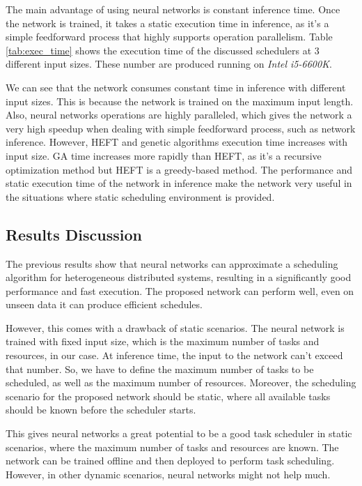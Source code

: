 The main advantage of using neural networks is constant inference time. Once the network is trained, it takes a static execution time in inference, as it's a simple feedforward process that highly supports operation parallelism. Table \ref{tab:exec_time} shows the execution time of the discussed schedulers at 3 different input sizes. These number are produced running on \emph{Intel i5-6600K}. 

We can see that the network consumes constant time in inference with different input sizes. This is because the network is trained on the maximum input length. Also, neural networks operations are highly paralleled, which gives the network a very high speedup when dealing with simple feedforward process, such as network inference. However, HEFT and genetic algorithms execution time increases with input size. GA time increases more rapidly than HEFT, as it's a recursive optimization method but HEFT is a greedy-based method. The performance and static execution time of the network in inference make the network very useful in the situations where static scheduling environment is provided.

\subsection{Results Discussion}
The previous results show that neural networks can approximate a scheduling algorithm for heterogeneous distributed systems, resulting in a significantly good performance and fast execution. The proposed network can perform well, even on unseen data it can produce efficient schedules.

However, this comes with a drawback of static scenarios. The neural network is trained with fixed input size, which is the maximum number of tasks and resources, in our case. At inference time, the input to the network can't exceed that number. So, we have to define the maximum number of tasks to be scheduled, as well as the maximum number of resources. Moreover, the scheduling scenario for the proposed network should be static, where all available tasks should be known before the scheduler starts. 

This gives neural networks a great potential to be a good task scheduler in static scenarios, where the maximum number of tasks and resources are known. The network can be trained offline and then deployed to perform task scheduling. However, in other dynamic scenarios, neural networks might not help much.